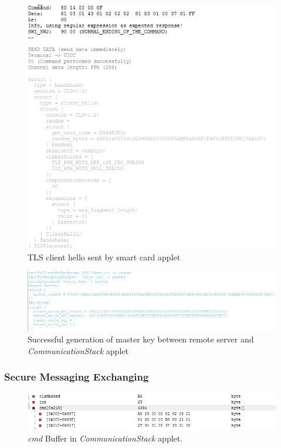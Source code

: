 \begin{figure}[!htb]
	\centering
	\includegraphics[width=1\textwidth]{Images/impl/client-hallo.png}
		\caption{TLS client hello sent by smart card applet}
	\label{fig:client-hello}
\end{figure}

\begin{figure}[!htb]
	\centering
	\includegraphics[width=1\textwidth]{Images/impl/master-key.png}
		\caption{Successful generation of master key between remote server and \emph{CommunicationStack} applet}
	\label{fig:mk}
\end{figure}


\subsubsection{Secure Messaging Exchanging}

\begin{figure}[!htb]
	\centering
	\includegraphics[width=1.2\textwidth]{Images/impl/cmd.png}
		\caption{\emph{cmd} Buffer in \emph{CommunicationStack} applet.}
	\label{fig:remote1}
\end{figure}

